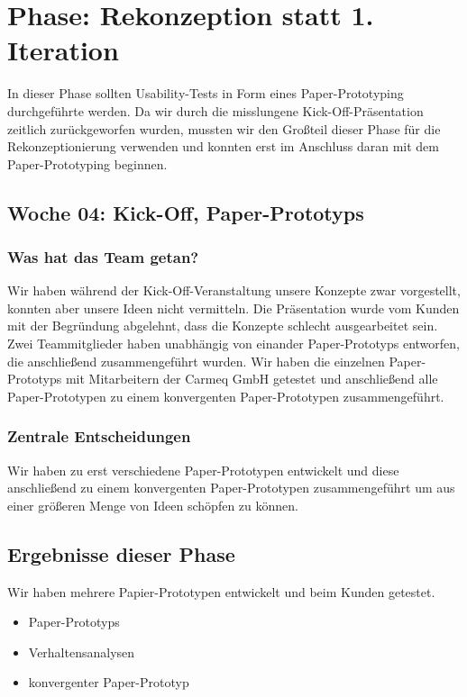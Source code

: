 \documentclass{article}
\begin{document}
\section{Phase: Rekonzeption statt 1. Iteration}

In dieser Phase sollten Usability-Tests in Form eines Paper-Prototyping durchgef\"uhrte werden. Da wir durch die misslungene Kick-Off-Pr\"asentation zeitlich zur\"uckgeworfen wurden, mussten wir den Gro\ss teil dieser Phase f\"ur die Rekonzeptionierung verwenden und konnten erst im Anschluss daran mit dem Paper-Prototyping beginnen.

\subsection{Woche 04: Kick-Off, Paper-Prototyps}

\subsubsection{Was hat das Team getan?}

Wir haben w\"ahrend der Kick-Off-Veranstaltung unsere Konzepte zwar vorgestellt, konnten aber unsere Ideen nicht vermitteln. Die Pr\"asentation wurde vom Kunden mit der Begr\"undung abgelehnt, dass die Konzepte schlecht ausgearbeitet sein.\\
Zwei Teammitglieder haben unabh\"angig von einander Paper-Prototyps entworfen, die anschlie\ss end zusammengef\"uhrt wurden. Wir haben die einzelnen Paper-Prototyps mit Mitarbeitern der Carmeq GmbH getestet und anschlie\ss end alle Paper-Prototypen zu einem konvergenten Paper-Prototypen zusammengef\"uhrt.

\subsubsection{Zentrale Entscheidungen}

Wir haben zu erst verschiedene Paper-Prototypen entwickelt und diese anschlie\ss end zu einem konvergenten Paper-Prototypen zusammengef\"uhrt um aus einer gr\"o\ss eren Menge von Ideen sch\"opfen zu k\"onnen. 

\subsection{Ergebnisse dieser Phase}

Wir haben mehrere Papier-Prototypen entwickelt und beim Kunden getestet.

\begin{itemize}
\item Paper-Prototyps
\item Verhaltensanalysen
\item konvergenter Paper-Prototyp
\end{itemize}
\end{document}
